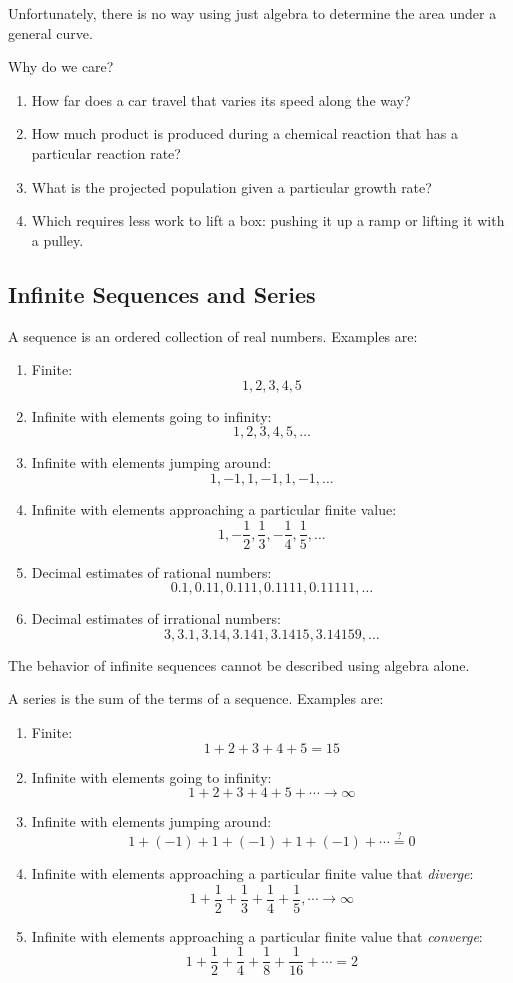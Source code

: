 \documentclass[letterpaper,12pt,fleqn]{article}
\begin{document}
Unfortunately, there is no way using just algebra to determine the area under a general curve.

Why do we care?
\begin{enumerate}
\item How far does a car travel that varies its speed along the way?
\item How much product is produced during a chemical reaction that has a particular reaction rate?
\item What is the projected population given a particular growth rate?
\item Which requires less work to lift a box: pushing it up a ramp or lifting it with a pulley.
\end{enumerate}

\subsection*{Infinite Sequences and Series}

A sequence is an ordered collection of real numbers.  Examples are:
\begin{enumerate}
\item Finite:
  \[1,2,3,4,5\]
\item Infinite with elements going to infinity:
  \[1,2,3,4,5,\ldots\]
\item Infinite with elements jumping around:
  \[1,-1,1,-1,1,-1,\ldots\]
\item Infinite with elements approaching a particular finite value:
  \[1,-\frac{1}{2},\frac{1}{3},-\frac{1}{4},\frac{1}{5},\ldots\]
\item Decimal estimates of rational numbers:
  \[0.1,0.11,0.111,0.1111,0.11111,\ldots\]
\item Decimal estimates of irrational numbers:
  \[3,3.1,3.14,3.141,3.1415,3.14159,\ldots\]
\end{enumerate}

The behavior of infinite sequences cannot be described using algebra alone.

A series is the sum of the terms of a sequence.  Examples are:
\begin{enumerate}
\item Finite:
  \[1+2+3+4+5=15\]
\item Infinite with elements going to infinity:
  \[1+2+3+4+5+\cdots\to\infty\]
\item Infinite with elements jumping around:
  \[1+(-1)+1+(-1)+1+(-1)+\cdots\stackrel{?}{=}0\]
\item Infinite with elements approaching a particular finite value that \emph{diverge}:
  \[1+\frac{1}{2}+\frac{1}{3}+\frac{1}{4}+\frac{1}{5},\cdots\to\infty\]
\item Infinite with elements approaching a particular finite value that \emph{converge}:
  \[1+\frac{1}{2}+\frac{1}{4}+\frac{1}{8}+\frac{1}{16}+\cdots=2\]
\end{enumerate}
\end{document}
